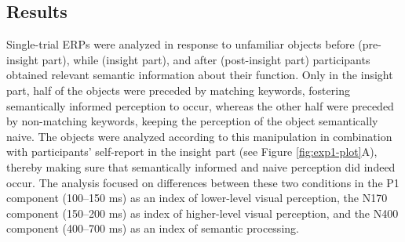 \documentclass[
  english,
  doc,12pt,twoside,floatsintext]{apa7}
\begin{document}
\hypertarget{results}{%
\subsection{Results}\label{results}}

Single-trial ERPs were analyzed in response to unfamiliar objects before (pre-insight part), while (insight part), and after (post-insight part) participants obtained relevant semantic information about their function. Only in the insight part, half of the objects were preceded by matching keywords, fostering semantically informed perception to occur, whereas the other half were preceded by non-matching keywords, keeping the perception of the object semantically naive. The objects were analyzed according to this manipulation in combination with participants' self-report in the insight part (see Figure \ref{fig:exp1-plot}A), thereby making sure that semantically informed and naive perception did indeed occur. The analysis focused on differences between these two conditions in the P1 component (100--150 ms) as an index of lower-level visual perception, the N170 component (150--200 ms) as index of higher-level visual perception, and the N400 component (400--700 ms) as an index of semantic processing.
\end{document}
